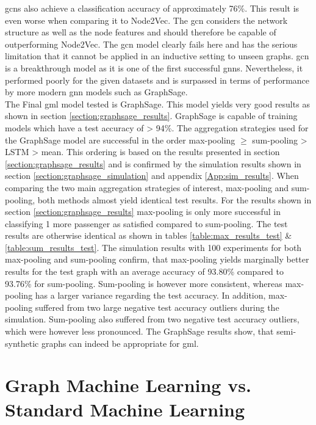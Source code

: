   \noindent \acsp{gcn} also achieve a classification accuracy of approximately 
  76\%. This result is even worse when comparing it to Node2Vec. The \acs{gcn} 
  considers the network structure as well as the node features and should 
  therefore be capable of outperforming Node2Vec. The \acs{gcn} model clearly 
  fails here and has the serious limitation that it cannot be applied in an 
  inductive setting to unseen graphs. \acs{gcn} is a breakthrough model 
  as it is one of the first successful \acsp{gnn}. Nevertheless, it 
  performed poorly for the given datasets and is surpassed in terms of 
  performance by more modern \acs{gnn} models such as GraphSage. \\

  \noindent The Final \acs{gml} model tested is GraphSage. This model yields 
  very good results as shown in section \ref{section:graphsage_results}. 
  GraphSage is capable of training models which have a test accuracy of > 94\%. 
  The aggregation strategies used for the GraphSage model are successful in the 
  order max-pooling $\geqslant$ sum-pooling > LSTM > mean. This ordering is 
  based on the results presented in section \ref{section:graphsage_results} and 
  is confirmed by the simulation results shown in section 
  \ref{section:graphsage_simulation} and appendix \ref{App:sim_results}. 
  When comparing the two main aggregation strategies of interest, max-pooling 
  and sum-pooling, both methods almost yield identical test results. For the
  results shown in section \ref{section:graphsage_results} max-pooling is only 
  more successful in classifying 1 more passenger as satisfied compared to
  sum-pooling. The test results are otherwise identical as shown in tables 
  \ref{table:max_results_test} \& \ref{table:sum_results_test}. The simulation
  results with 100 experiments for both max-pooling and sum-pooling confirm,
  that max-pooling yields marginally better results for the test graph with an
  average accuracy of 93.80\% compared to 93.76\% for sum-pooling. Sum-pooling
  is however more consistent, whereas max-pooling has a larger variance 
  regarding the test accuracy. In addition, max-pooling suffered from two large 
  negative test accuracy outliers during the simulation. Sum-pooling also 
  suffered from two negative test accuracy outliers, which were however less 
  pronounced. The GraphSage results show, that semi-synthetic graphs can indeed 
  be appropriate for \acs{gml}.

  \section[GML vs. Standard ML]{Graph Machine Learning vs. Standard Machine Learning}
  \label{section:comp_disc}

